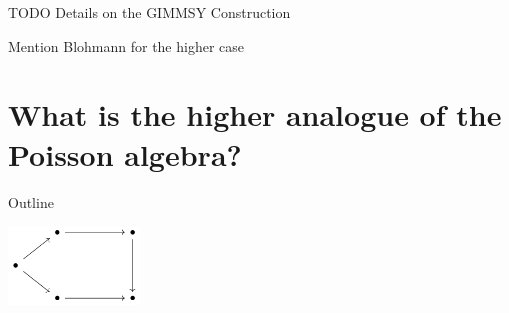 \documentclass[10pt]{beamer}
\renewcommand{\checkpoint}[0]{
	\setcounter{tocdepth}{1}
	\addtocounter{framenumber}{-1}
 	\begin{frame}[t]{Outline}
  		\tableofcontents[currentsection]
		\begin{center}
			\includegraphics[width=3.5cm]{Pictures/Figure_pentagondiagm_page}
		\end{center}
	\end{frame}
}
\begin{document}
\begin{frame}[fragile]{TODO}
	Details on the GIMMSY Construction
	
	Mention Blohmann for the higher case
\end{frame}


\section{What is the \textbf{higher analogue} of the \textbf{Poisson algebra}?}
\checkpoint	
\end{document}
